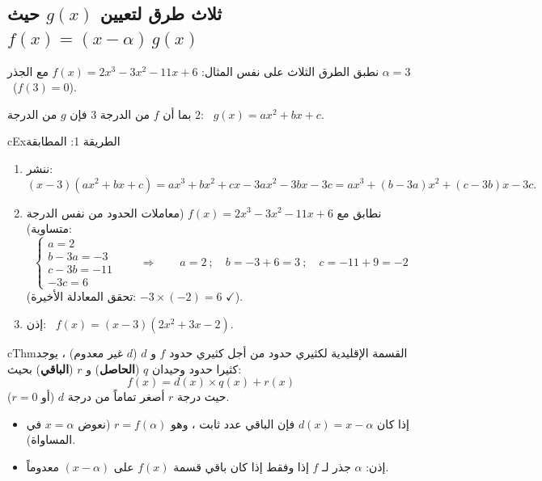 \documentclass[12pt,a4paper]{article}
\newenvironment{BOX}[2]{\begin{otherlanguage}{english}\begin{arbox}{#1}{#2}}{\end{arbox}\end{otherlanguage}}
\newenvironment{khassia}[1][خاصية]{\begin{BOX}{cThm}{#1}}{\end{BOX}}
\begin{document}
\subsection{ثلاث طرق لتعيين $g(x)$ حيث $f(x)=(x-\alpha)\,g(x)$}
نطبق الطرق الثلاث على نفس المثال: \quad $f(x)=2x^3-3x^2-11x+6$ \quad مع الجذر $\alpha=3$ \ ($f(3)=0$).\par
بما أن $f$ من الدرجة $3$ فإن $g$ من الدرجة $2$: \ $g(x)=ax^2+bx+c$.
\begin{otherlanguage}{english}\begin{arbox}[breakable]{cEx}{الطريقة 1: المطابقة}
\begin{enumerate}
\item ننشر:
\[(x-3)\left(ax^2+bx+c\right)=ax^3+bx^2+cx-3ax^2-3bx-3c=ax^3+(b-3a)x^2+(c-3b)x-3c.\]
\item نطابق مع $f(x)=2x^3-3x^2-11x+6$ (معاملات الحدود من نفس الدرجة متساوية):
\[\begin{cases}a=2\\ b-3a=-3\\ c-3b=-11\\ -3c=6\end{cases}\qquad\Longrightarrow\qquad a=2\ ;\quad b=-3+6=3\ ;\quad c=-11+9=-2\]
(تحقق المعادلة الأخيرة: $-3\times(-2)=6$ $\checkmark$).
\item إذن: \ $\boxed{f(x)=(x-3)\left(2x^2+3x-2\right)}$.
\end{enumerate}
\end{arbox}\end{otherlanguage}
\begin{khassia}[القسمة الإقليدية لكثيري حدود]
من أجل كثيري حدود $f$ و $d$ ($d$ غير معدوم) ، يوجد كثيرا حدود وحيدان $q$ (\textbf{الحاصل}) و $r$ (\textbf{الباقي}) بحيث:
\[f(x)=d(x)\times q(x)+r(x)\]
حيث درجة $r$ أصغر تماماً من درجة $d$ (أو $r=0$).
\begin{itemize}
\item إذا كان $d(x)=x-\alpha$ فإن الباقي عدد ثابت ، وهو $\boxed{r=f(\alpha)}$ (نعوض $x=\alpha$ في المساواة).
\item إذن: $\alpha$ جذر لـ $f$ إذا وفقط إذا كان باقي قسمة $f(x)$ على $(x-\alpha)$ معدوماً.
\end{itemize}
\end{khassia}
\end{document}
